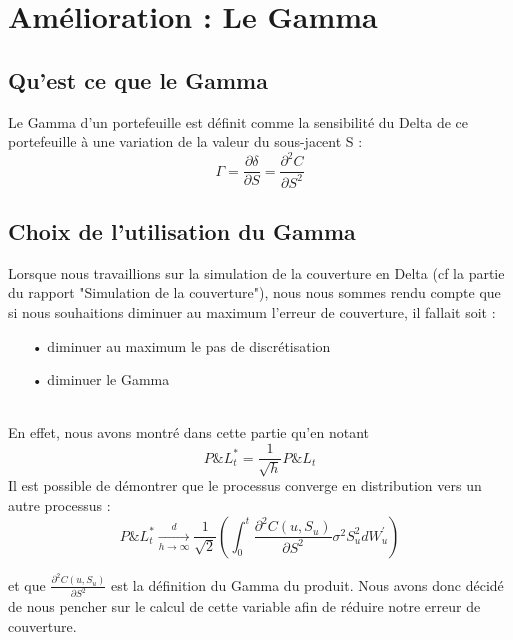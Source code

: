 \documentclass[french,12pt,a4paper]{article}
\begin{document}
\section{Amélioration : Le Gamma}

\subsection{Qu'est ce que le Gamma}
Le Gamma d'un portefeuille est définit comme la sensibilité du Delta de ce portefeuille à une variation de la valeur du sous-jacent S : 
$$ \Gamma = \frac{\partial \delta }{\partial S} = \frac{\partial^2 C }{\partial S^2}   $$
\subsection{Choix de l'utilisation du Gamma}
Lorsque nous travaillions sur la simulation de la couverture en Delta (cf la partie du rapport "Simulation de la couverture"), nous nous sommes rendu compte que si nous souhaitions diminuer au maximum l'erreur de couverture, il fallait soit : 
\begin{itemize}
\item[•] diminuer au maximum le pas de discrétisation
\item[•] diminuer le Gamma
\end{itemize}
\\
En effet, nous avons montré dans cette partie qu'en notant 
$$ P\&L_{t}^{*} = \frac{1}{\sqrt{h}} P\&L_{t} $$
Il est possible de démontrer que le processus converge en distribution vers un autre processus : 
$$P\&L_{t}^{*} \underset{h\rightarrow \infty}{\overset{d}{\rightarrow}} \frac{1}{\sqrt{2}}(\int_{0}^t \frac{\partial^2 C(u, S_{u})}{\partial S^{2}} \sigma^2 S_{u}^2 dW_{u}^{'})$$

et que $\frac{\partial^2 C(u, S_{u})}{\partial S^{2}}$ est la définition du Gamma du produit.
Nous avons donc décidé de nous pencher sur le calcul de cette variable afin de réduire notre erreur de couverture.
\end{document}
